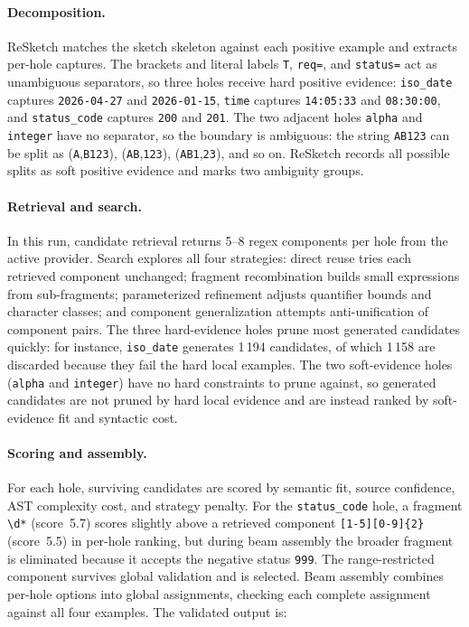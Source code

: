 \documentclass[sigconf,nonacm]{acmart}
\begin{document}
\paragraph{Decomposition.}
ReSketch matches the sketch skeleton against each positive example and extracts
per-hole captures. The brackets and literal labels \texttt{T}, \texttt{req=},
and \texttt{status=} act as unambiguous separators, so three holes receive
hard positive evidence: \texttt{iso\_date} captures \texttt{2026-04-27} and
\texttt{2026-01-15}, \texttt{time} captures \texttt{14:05:33} and
\texttt{08:30:00}, and \texttt{status\_code} captures \texttt{200} and
\texttt{201}. The two adjacent holes \texttt{alpha} and \texttt{integer} have
no separator, so the boundary is ambiguous: the string \texttt{AB123} can be
split as (\texttt{A},\texttt{B123}), (\texttt{AB},\texttt{123}),
(\texttt{AB1},\texttt{23}), and so on. ReSketch records all possible splits as
soft positive evidence and marks two ambiguity groups.

\paragraph{Retrieval and search.}
In this run, candidate retrieval returns 5--8 regex components per hole from the active
provider. Search explores all four strategies: direct reuse tries each
retrieved component unchanged; fragment recombination builds small expressions
from sub-fragments; parameterized refinement adjusts quantifier bounds and
character classes; and component generalization attempts anti-unification of
component pairs. The three hard-evidence holes prune most generated candidates
quickly: for instance, \texttt{iso\_date} generates 1\,194 candidates, of
which 1\,158 are discarded because they fail the hard local examples. The two
soft-evidence holes (\texttt{alpha} and \texttt{integer}) have no hard
constraints to prune against, so generated candidates are not pruned by hard
local evidence and are instead ranked by soft-evidence fit and syntactic cost.

\paragraph{Scoring and assembly.}
For each hole, surviving candidates are scored by semantic fit, source
confidence, AST complexity cost, and strategy penalty. For the
\texttt{status\_code} hole, a fragment \texttt{\textbackslash d*}
(score~5.7) scores slightly above a retrieved component
\texttt{[1-5][0-9]\{2\}} (score~5.5) in per-hole ranking, but during beam
assembly the broader fragment is eliminated because it accepts the negative
status \texttt{999}. The range-restricted component survives global
validation and is selected. Beam assembly combines per-hole options into
global assignments, checking each complete assignment against all four
examples. The
validated output is:
\end{document}

